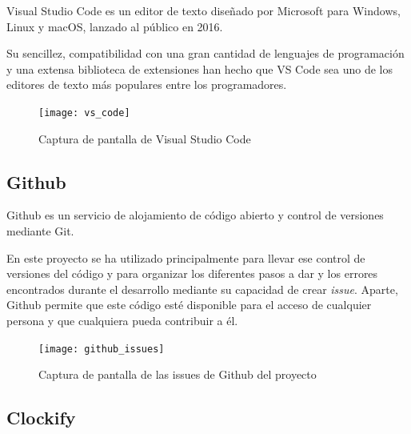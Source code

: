             Visual Studio Code es un editor de texto diseñado por Microsoft para Windows, Linux y macOS, lanzado al
            público en 2016.

            Su sencillez, compatibilidad con una gran cantidad de lenguajes de programación y una extensa biblioteca de
            extensiones han hecho que VS Code sea uno de los editores de texto más populares entre los programadores.
            \cite{wikipedia_vs_code}

            \begin{figure}[ht]
                \centering
                \texttt{[image: vs\_code]}
                \caption{Captura de pantalla de Visual Studio Code \label{fig:VisualStudioCode}}
            \end{figure}

            \newpage


        \subsection{Github} %
        \label{sub:Github}

            Github es un servicio de alojamiento de código abierto y control de versiones mediante Git.

            En este proyecto se ha utilizado principalmente para llevar ese control de versiones del código y para
            organizar los diferentes pasos a dar y los errores encontrados durante el desarrollo mediante su capacidad
            de crear \textit{issue}. Aparte, Github permite que este código esté disponible para el acceso de cualquier
            persona y que cualquiera pueda contribuir a él.

            \begin{figure}[ht]
                \centering
                \texttt{[image: github\_issues]}
                \caption{Captura de pantalla de las issues de Github del proyecto \label{fig:GithubIssues}}
            \end{figure}

            \newpage


        \subsection{Clockify} %
        \label{sub:Clockify}

